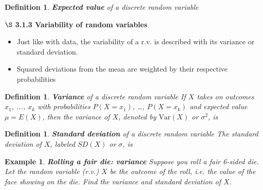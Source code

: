 \documentclass[12pt]{amsart}
\newtheorem{definition}[theorem]{Definition}
\newtheorem{example}[theorem]{Example}
\begin{document}
{\begin{definition}{\textbf{Expected value} of a discrete random variable}
\end{definition}



$\S$ \textbf{3.1.3 Variability of random variables}

\vspace{.5cm}

\begin{itemize}
\item Just like with data, the variability of a r.v. is described with its variance or standard deviation.
\item Squared deviations from the mean are weighted by their respective probabilities
\end{itemize}

\vspace{.5cm}

\begin{definition}{\textbf{Variance} of a discrete random variable} \newline
If $X$ takes on outcomes $x_1$, ..., $x_k$ with probabilities $P(X=x_1)$, \dots, $P(X=x_k)$ and expected value $\mu=E(X)$, then the variance of $X$, denoted by $\text{Var}(X)$ or $\sigma^2$, is

%
\vspace{4.5cm}
\end{definition}

\begin{definition}{\textbf{Standard deviation} of a discrete random variable} \newline
The standard deviation of $X$, labeled $SD(X)$ or $\sigma$, is 


\end{definition}



\newpage
\begin{example}  \textbf{Rolling a fair die: variance} \newline
Suppose you roll a fair 6-sided die. Let the random variable (r.v.) $X$ be the outcome of the roll, i.e. the value of the face showing on the die.  \newline
Find the variance and standard deviation of $X$.



\end{example}}
\end{document}
